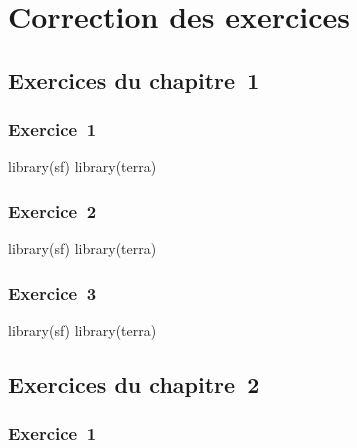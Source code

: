 \documentclass[
  letterpaper,
  DIV=11,
  numbers=noendperiod]{scrreprt}
\newenvironment{Shaded}{\begin{snugshade}}{\end{snugshade}}
\newcommand{\NormalTok}[1]{\textcolor[rgb]{0.00,0.23,0.31}{#1}}
\begin{document}

\chapter{Correction des exercices}\label{sec-chap10}

\section{Exercices du chapitre~1}\label{sec-0801}

\subsection{Exercice~1}\label{sec-08011}

\begin{Shaded}
\begin{Highlighting}[]
\NormalTok{library(sf)}
\NormalTok{library(terra)}
\end{Highlighting}
\end{Shaded}

\subsection{Exercice~2}\label{sec-08012}

\begin{Shaded}
\begin{Highlighting}[]
\NormalTok{library(sf)}
\NormalTok{library(terra)}
\end{Highlighting}
\end{Shaded}

\subsection{Exercice~3}\label{sec-08013}

\begin{Shaded}
\begin{Highlighting}[]
\NormalTok{library(sf)}
\NormalTok{library(terra)}
\end{Highlighting}
\end{Shaded}

\section{Exercices du chapitre~2}\label{sec-0802}

\subsection{Exercice~1}\label{sec-08021}
\end{document}
